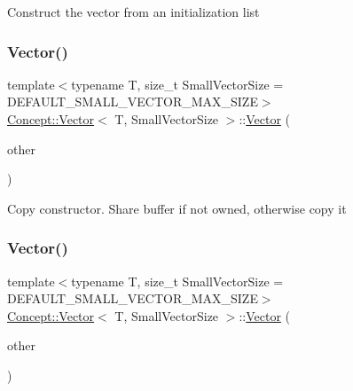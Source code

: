 Construct the vector from an initialization list \mbox{\label{class_concept_1_1_vector_af9fdc77be6f6efa6c5bae8c565c32c1a}} 
\subsubsection{\texorpdfstring{Vector()}{Vector()}\hspace{0.1cm}{\footnotesize\ttfamily [3/7]}}
{\footnotesize\ttfamily template$<$typename T, size\+\_\+t Small\+Vector\+Size = D\+E\+F\+A\+U\+L\+T\+\_\+\+S\+M\+A\+L\+L\+\_\+\+V\+E\+C\+T\+O\+R\+\_\+\+M\+A\+X\+\_\+\+S\+I\+ZE$>$ \\
\mbox{\hyperlink{class_concept_1_1_vector}{Concept\+::\+Vector}}$<$ T, Small\+Vector\+Size $>$\+::\mbox{\hyperlink{class_concept_1_1_vector}{Vector}} (\begin{DoxyParamCaption}\item[{const \mbox{\hyperlink{class_concept_1_1_vector}{Vector}}$<$ T, Small\+Vector\+Size $>$ \&}]{other }\end{DoxyParamCaption})\hspace{0.3cm}{\ttfamily [inline]}}

Copy constructor. Share buffer if not owned, otherwise copy it \mbox{\label{class_concept_1_1_vector_a23dd7da897297e5b69f1eefc55815cc0}} 
\subsubsection{\texorpdfstring{Vector()}{Vector()}\hspace{0.1cm}{\footnotesize\ttfamily [4/7]}}
{\footnotesize\ttfamily template$<$typename T, size\+\_\+t Small\+Vector\+Size = D\+E\+F\+A\+U\+L\+T\+\_\+\+S\+M\+A\+L\+L\+\_\+\+V\+E\+C\+T\+O\+R\+\_\+\+M\+A\+X\+\_\+\+S\+I\+ZE$>$ \\
\mbox{\hyperlink{class_concept_1_1_vector}{Concept\+::\+Vector}}$<$ T, Small\+Vector\+Size $>$\+::\mbox{\hyperlink{class_concept_1_1_vector}{Vector}} (\begin{DoxyParamCaption}\item[{\mbox{\hyperlink{class_concept_1_1_vector}{Vector}}$<$ T, Small\+Vector\+Size $>$ \&\&}]{other }\end{DoxyParamCaption})\hspace{0.3cm}{\ttfamily [inline]}}

